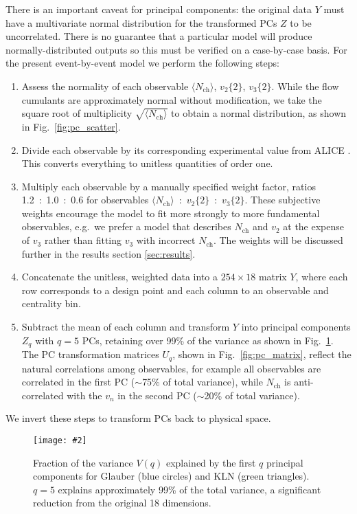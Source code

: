 \documentclass[aps,prc,reprint,superscriptaddress,amsmath]{revtex4-1}
\newcommand{\colfig}[3][t]{
  \begin{figure}[#1]
    \texttt{[image: \#2]}
    \caption{\label{fig:#2}#3}
  \end{figure}
}
\newcommand{\avg}[1]{\langle #1 \rangle}
\newcommand{\nch}{N_\text{ch}}
\newcommand{\vnk}[2]{v_#1\{#2\}}
\begin{document}
There is an important caveat for principal components:
the original data $Y$ must have a multivariate normal distribution for the transformed PCs $Z$ to be uncorrelated.
There is no guarantee that a particular model will produce normally-distributed outputs so this must be verified on a case-by-case basis.
For the present event-by-event model we perform the following steps:
\begin{enumerate}
  \item Assess the normality of each observable $\avg\nch$, $\vnk 2 2$, $\vnk 3 2$.
    While the flow cumulants are approximately normal without modification, we take the square root of multiplicity $\sqrt{\avg\nch}$ to obtain a normal distribution, as shown in Fig.~\ref{fig:pc_scatter}.
  \item Divide each observable by its corresponding experimental value from ALICE \cite{Abelev:2014mda}.
    This converts everything to unitless quantities of order one.
  \item Multiply each observable by a manually specified weight factor, ratios 1.2~:~1.0~:~0.6 for observables $\avg\nch$~:~$\vnk 2 2$~:~$\vnk 3 2$.
    These subjective weights encourage the model to fit more strongly to more fundamental observables, e.g.\ we prefer a model that describes $\nch$ and $v_2$ at the expense of $v_3$ rather than fitting $v_3$ with incorrect $\nch$.
    The weights will be discussed further in the results section \ref{sec:results}.
  \item Concatenate the unitless, weighted data into a $254 \times 18$ matrix $Y$, where each row corresponds to a design point and each column to an observable and centrality bin.
  \item Subtract the mean of each column and transform $Y$ into principal components $Z_q$ with $q = 5$ PCs, retaining over 99\% of the variance as shown in Fig.~\ref{fig:pc_var}.
    The PC transformation matrices $U_q$, shown in Fig.~\ref{fig:pc_matrix}, reflect the natural correlations among observables, for example all observables are correlated in the first PC (${\sim}$75\% of total variance), while $N_\text{ch}$ is anti-correlated with the $v_n$ in the second PC (${\sim}$20\% of total variance).
\end{enumerate}
We invert these steps to transform PCs back to physical space.

\colfig[t]{pc_var}{
  Fraction of the variance $V(q)$ explained by the first $q$ principal components for Glauber (blue circles) and KLN (green triangles).
  $q = 5$ explains approximately 99\% of the total variance, a significant reduction from the original 18 dimensions.
}
\end{document}
